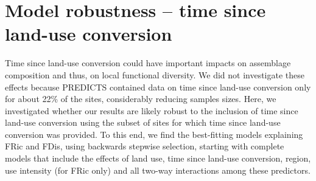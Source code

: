 \newpage
\clearpage
\section{Model robustness -- time since land-use conversion}
Time since land-use conversion could have important impacts on assemblage composition and thus, on local functional diversity. We did not investigate these effects because PREDICTS contained data on time since land-use conversion only for about 22\% of the sites, considerably reducing samples sizes. Here, we investigated whether our results are likely robust to the inclusion of time since land-use conversion using the subset of sites for which  time since land-use conversion was provided. To this end, we find the best-fitting models explaining FRic and FDis, using backwards stepwise selection, starting with complete models that include the effects of land use, time since land-use conversion, region, use intensity (for FRic only) and all two-way interactions among these predictors. 

